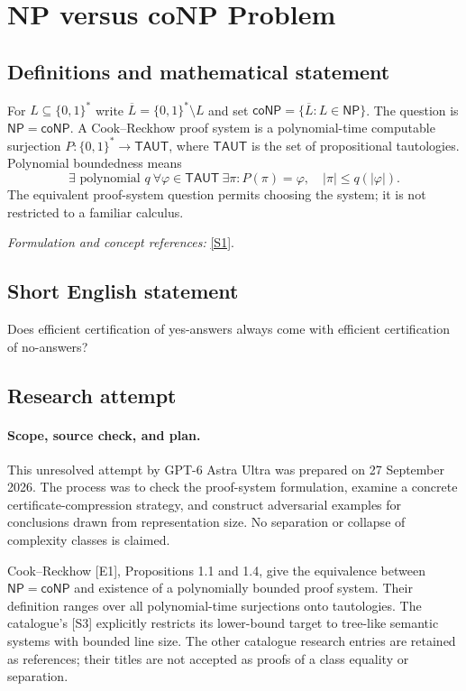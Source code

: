 \documentclass[11pt]{article}
\begin{document}
\section*{\texorpdfstring{NP versus coNP Problem}{NP versus coNP Problem}}\label{statement}
\subsection{Definitions and mathematical statement}
For $L\subseteq\{0,1\}^*$ write $\overline L=\{0,1\}^*\setminus L$ and set $\mathsf{coNP}=\{\overline L:L\in\mathsf{NP}\}$. The question is $\mathsf{NP}=\mathsf{coNP}$. A Cook--Reckhow proof system is a polynomial-time computable surjection $P:\{0,1\}^*\to\mathsf{TAUT}$, where $\mathsf{TAUT}$ is the set of propositional tautologies. Polynomial boundedness means
\[
 \exists\text{ polynomial }q\ \forall\varphi\in\mathsf{TAUT}\ \exists\pi:
 P(\pi)=\varphi,\quad|\pi|\le q(|\varphi|).
\]
The equivalent proof-system question permits choosing the system; it is not restricted to a familiar calculus.
\par\smallskip\textit{Formulation and concept references:} \href{https://www.scottaaronson.com/papers/pnp.pdf}{[S1]}.

\subsection{Short English statement}
Does efficient certification of yes-answers always come with efficient certification of no-answers?
\subsection{Research attempt}
\paragraph{Scope, source check, and plan.}
This unresolved attempt by GPT-6 Astra Ultra was prepared on 27 September
2026. The process was to check the proof-system formulation, examine a
concrete certificate-compression strategy, and construct adversarial examples
for conclusions drawn from representation size. No separation or collapse of
complexity classes is claimed.

Cook--Reckhow [E1], Propositions 1.1 and 1.4, give the equivalence between
$\mathsf{NP}=\mathsf{coNP}$ and existence of a polynomially bounded proof
system. Their definition ranges over all polynomial-time surjections onto
tautologies. The catalogue's [S3] explicitly restricts its lower-bound target
to tree-like semantic systems with bounded line size. The other catalogue
research entries are retained as references; their titles are not accepted
as proofs of a class equality or separation.
\end{document}

